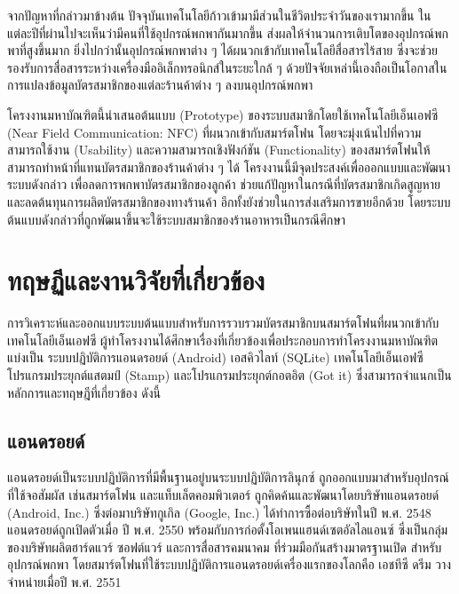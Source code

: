 \documentclass[12pt,a4paper,twocolumn]{article}
\begin{document}
จากปัญหาที่กล่าวมาข้างต้น ปัจจุบันเทคโนโลยีก้าวเข้ามามีส่วนในชีวิตประจำวันของเรามากขึ้น ในแต่ละปีที่ผ่านไปจะเห็นว่ามีคนที่ใช้อุปกรณ์พกพากันมากขึ้น ส่งผลให้จำนวนการเติบโตของอุปกรณ์พกพาที่สูงขึ้นมาก \cite{itm:shopping} ยิ่งไปกว่านั้นอุปกรณ์พกพาต่าง ๆ ได้ผนวกเข้ากับเทคโนโลยีสื่อสารไร้สาย ซึ่งจะช่วยรองรับการสื่อสารระหว่างเครื่องมืออิเล็กทรอนิกส์ในระยะใกล้ ๆ \cite{itm:rpp-mobile} ด้วยปัจจัยเหล่านี้เองถือเป็นโอกาสในการแปลงข้อมูลบัตรสมาชิกของแต่ละร้านค้าต่าง ๆ ลงบนอุปกรณ์พกพา 

โครงงานมหาบัณฑิตนี้นำเสนอต้นแบบ (Prototype) ของระบบสมาชิกโดยใช้เทคโนโลยีเอ็นเอฟซี (Near Field Communication: NFC) ที่ผนวกเข้ากับสมาร์ตโฟน โดยจะมุ่งเน้นไปที่ความสามารถใช้งาน (Usability) และความสามารถเชิงฟังก์ชัน (Functionality) ของสมาร์ตโฟนให้สามารถทำหน้าที่แทนบัตรสมาชิกของร้านค้าต่าง ๆ ได้ โครงงานนี้มีจุดประสงค์เพื่อออกแบบและพัฒนาระบบดังกล่าว เพื่อลดการพกพาบัตรสมาชิกของลูกค้า ช่วยแก้ปัญหาในกรณีที่บัตรสมาชิกเกิดสูญหาย และลดต้นทุนการผลิตบัตรสมาชิกของทางร้านค้า อีกทั้งยังช่วยในการส่งเสริมการขายอีกด้วย โดยระบบต้นแบบดังกล่าวที่ถูกพัฒนาขึ้นจะใช้ระบบสมาชิกของร้านอาหารเป็นกรณีศึกษา


\section{ทฤษฏีและงานวิจัยที่เกี่ยวข้อง}
การวิเคราะห์และออกแบบระบบต้นแบบสำหรับการรวบรวมบัตรสมาชิกบนสมาร์ตโฟนที่ผนวกเข้ากับเทคโนโลยีเอ็นเอฟซี ผู้ทำโครงงานได้ศึกษาเรื่องที่เกี่ยวข้องเพื่อประกอบการทําโครงงานมหาบัณฑิต แบ่งเป็น ระบบปฏิบัติการแอนดรอยด์ (Android) เอสคิวไลท์ (SQLite) เทคโนโลยีเอ็นเอฟซี โปรแกรมประยุกต์แสตมป์ (Stamp) และโปรแกรมประยุกต์กอตอิต (Got it) ซึ่งสามารถจําแนกเป็นหลักการและทฤษฎีที่เกี่ยวข้อง ดังนี้

\subsection{แอนดรอยด์}
แอนดรอยด์เป็นระบบปฏิบัติการที่มีพื้นฐานอยู่บนระบบปฏิบัติการลินุกซ์ ถูกออกแบบมาสำหรับอุปกรณ์ที่ใช้จอสัมผัส เช่นสมาร์ตโฟน และแท็บเล็ตคอมพิวเตอร์ ถูกคิดค้นและพัฒนาโดยบริษัทแอนดรอยด์ (Android, Inc.) ซึ่งต่อมาบริษัทกูเกิล (Google, Inc.) ได้ทำการซื้อต่อบริษัทในปี พ.ศ. 2548 แอนดรอยด์ถูกเปิดตัวเมื่อ ปี พ.ศ. 2550 พร้อมกับการก่อตั้งโอเพนแฮนด์เซตอัลไลแอนซ์ ซึ่งเป็นกลุ่มของบริษัทผลิตฮาร์ดแวร์ ซอฟต์แวร์ และการสื่อสารคมนาคม ที่ร่วมมือกันสร้างมาตรฐานเปิด สำหรับอุปกรณ์พกพา โดยสมาร์ตโฟนที่ใช้ระบบปฏิบัติการแอนดรอยด์เครื่องแรกของโลกคือ เอชทีซี ดรีม วางจำหน่ายเมื่อปี พ.ศ. 2551
\end{document}
